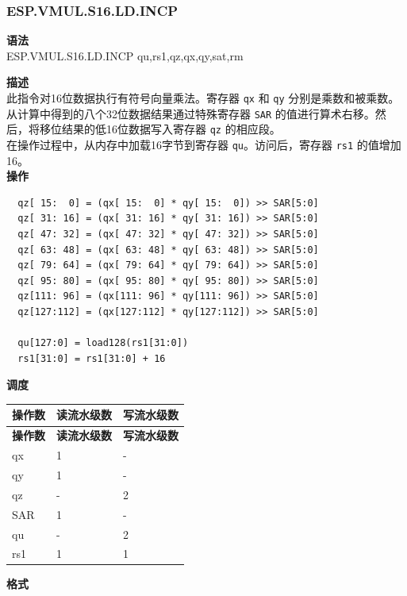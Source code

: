 \newpage

\newpage
\subsubsection{ESP.VMUL.S16.LD.INCP}\label{instruction:ESPVMULS16LDINCP}
\textbf{语法}\\
ESP.VMUL.S16.LD.INCP qu,rs1,qz,qx,qy,sat,rm

\textbf{描述}\\
此指令对16位数据执行有符号向量乘法。寄存器 \lstinline{qx} 和 \lstinline{qy} 分别是乘数和被乘数。从计算中得到的八个32位数据结果通过特殊寄存器 \lstinline{SAR} 的值进行算术右移。然后，将移位结果的低16位数据写入寄存器 \lstinline{qz} 的相应段。\\
在操作过程中，从内存中加载16字节到寄存器 \lstinline{qu}。访问后，寄存器 \lstinline{rs1} 的值增加16。\\
\textbf{操作}
\begin{lstlisting}
  qz[ 15:  0] = (qx[ 15:  0] * qy[ 15:  0]) >> SAR[5:0]
  qz[ 31: 16] = (qx[ 31: 16] * qy[ 31: 16]) >> SAR[5:0]
  qz[ 47: 32] = (qx[ 47: 32] * qy[ 47: 32]) >> SAR[5:0]
  qz[ 63: 48] = (qx[ 63: 48] * qy[ 63: 48]) >> SAR[5:0]
  qz[ 79: 64] = (qx[ 79: 64] * qy[ 79: 64]) >> SAR[5:0]
  qz[ 95: 80] = (qx[ 95: 80] * qy[ 95: 80]) >> SAR[5:0]
  qz[111: 96] = (qx[111: 96] * qy[111: 96]) >> SAR[5:0]
  qz[127:112] = (qx[127:112] * qy[127:112]) >> SAR[5:0]

  qu[127:0] = load128(rs1[31:0])
  rs1[31:0] = rs1[31:0] + 16
\end{lstlisting}


\textbf{调度}\\
\begin{longtable}[c]{|l|l|l|}
    \hline
    \rowcolor{lightgray}
    \textbf{操作数} & \textbf{读流水级数} & \textbf{写流水级数} \\\hline
    \endfirsthead
    \hline
    \rowcolor{lightgray}
     \textbf{操作数} & \textbf{读流水级数} & \textbf{写流水级数} \\\hline
    \endhead
    \hline
    \endfoot

    qx & 1 & - \\\hline
  qy & 1 & - \\\hline
     qz & - & 2 \\\hline
    SAR & 1 & - \\\hline
    qu & - & 2 \\\hline
    rs1 & 1 & 1
\end{longtable}

\textbf{格式}\\

